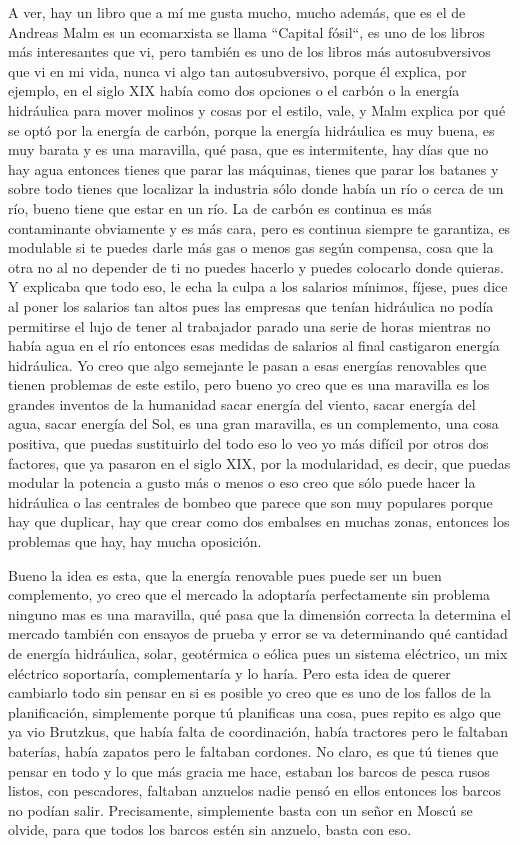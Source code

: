 A ver, hay un libro que a mí me gusta mucho, mucho además, que es el de Andreas Malm es un ecomarxista se llama ``Capital fósil``, es uno de los libros más interesantes que vi, pero también es uno de los libros más autosubversivos que vi en mi vida, nunca vi algo tan autosubversivo, porque él explica, por ejemplo, en el siglo XIX había como dos opciones o el carbón o la energía hidráulica para mover molinos y cosas por el estilo, vale, y Malm explica por qué se optó por la energía de carbón, porque la energía hidráulica es muy buena, es muy barata y es una maravilla, qué pasa, que es intermitente, hay días que no hay agua entonces tienes que parar las máquinas, tienes que parar los batanes y sobre todo tienes que localizar la industria sólo donde había un río o cerca de un río, bueno tiene que estar en un río. La de carbón es continua es más contaminante obviamente y es más cara, pero es continua siempre te garantiza, es modulable si te puedes darle más gas o menos gas según compensa, cosa que la otra no al no depender de ti no puedes hacerlo y puedes colocarlo donde quieras. Y explicaba que todo eso, le echa la culpa a los salarios mínimos, fíjese, pues dice al poner los salarios tan altos pues las empresas que tenían hidráulica no podía permitirse el lujo de tener al trabajador parado una serie de horas mientras no había agua en el río entonces esas medidas de salarios al final castigaron energía hidráulica. Yo creo que algo semejante le pasan a esas energías renovables que tienen problemas de este estilo, pero bueno yo creo que es una maravilla es los grandes inventos de la humanidad sacar energía del viento, sacar energía del agua, sacar energía del Sol, es una gran maravilla, es un complemento, una cosa positiva, que puedas sustituirlo del todo eso lo veo yo más difícil por otros dos factores, que ya pasaron en el siglo XIX, por la modularidad, es decir, que puedas modular la potencia a gusto más o menos o eso creo que sólo puede hacer la hidráulica o las centrales de bombeo que parece que son muy populares porque hay que duplicar, hay que crear como dos embalses en muchas zonas, entonces los problemas que hay, hay mucha oposición.

Bueno la idea es esta, que la energía renovable pues puede ser un buen complemento, yo creo que el mercado la adoptaría perfectamente sin problema ninguno mas es una maravilla, qué pasa que la dimensión correcta la determina el mercado también con ensayos de prueba y error se va determinando qué cantidad de energía hidráulica, solar, geotérmica o eólica pues un sistema eléctrico, un mix eléctrico soportaría, complementaría y lo haría. Pero esta idea de querer cambiarlo todo sin pensar en si es posible yo creo que es uno de los fallos de la planificación, simplemente porque tú planificas una cosa, pues repito es algo que ya vio Brutzkus, que había falta de coordinación, había tractores pero le faltaban baterías, había zapatos pero le faltaban cordones. No claro, es que tú tienes que pensar en todo y lo que más gracia me hace, estaban los barcos de pesca rusos listos, con pescadores, faltaban anzuelos nadie pensó en ellos entonces los barcos no podían salir. Precisamente, simplemente basta con un señor en Moscú se olvide, para que todos los barcos estén sin anzuelo, basta con eso.

